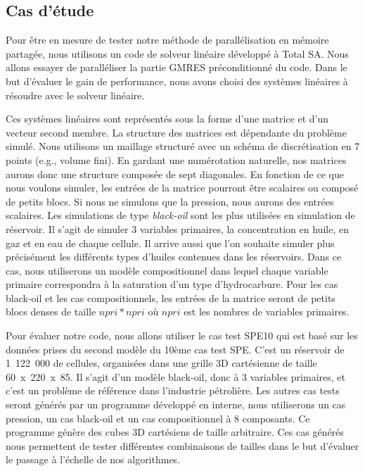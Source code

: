 \subsection{Cas d'étude}
Pour être en mesure de tester notre méthode de parallélisation en mémoire partagée, nous utilisons un code de solveur linéaire développé à Total SA.
%
Nous allons essayer de paralléliser la partie GMRES préconditionné du code.
%
Dans le but d'évaluer le gain de performance, nous avons choisi des systèmes linéaires à résoudre avec le solveur linéaire.

Ces systèmes linéaires sont représentés sous la forme d'une matrice et d'un vecteur second membre.
%
La structure des matrices est dépendante du problème simulé.
%
Nous utilisons un maillage structuré avec un schéma de discrétisation en 7 points (e.g., volume fini).
%
En gardant une numérotation naturelle, nos matrices aurons donc une structure composée de sept diagonales.
%
En fonction de ce que nous voulons simuler, les entrées de la matrice pourront être scalaires ou composé de petits blocs.
%
Si nous ne simulons que la pression, nous aurons des entrées scalaires.
%
Les simulations de type {\em black-oil} sont les plus utilisées en simulation de réservoir.
%
Il s'agit de simuler 3 variables primaires, la concentration en huile, en gaz et en eau de chaque cellule.
%
Il arrive aussi que l'on souhaite simuler plus précisément les différents types d'huiles contenues dans les réservoirs.
%
Dans ce cas, nous utiliserons un modèle compositionnel dans lequel chaque variable primaire correspondra à la saturation d'un type d'hydrocarbure.
%
Pour les cas black-oil et les cas compositionnels, les entrées de la matrice seront de petits blocs denses de taille $npri*npri$ où $npri$ est les nombres de variables primaires.

Pour évaluer notre code, nous allons utiliser le cas test SPE10 qui est basé sur les données prises du second modèle du 10ème cas test SPE\cite{SPE10}.
%
C'est un réservoir de 1~122~000 de cellules, organisées dans une grille 3D cartésienne de taille 60~x~220~x~85.
%
Il s'agit d'un modèle black-oil, donc à 3 variables primaires, et c'est un problème de référence dans l'industrie pétrolière.
%
Les autres cas tests seront générés par un programme développé en interne, nous utiliserons un cas pression, un cas black-oil et un cas compositionnel à 8 composants.
%
Ce programme génère des cubes 3D cartésiens de taille arbitraire.
%
Ces cas générés nous permettent de tester différentes combinaisons de tailles dans le but d'évaluer le passage à l'échelle de nos algorithmes.

